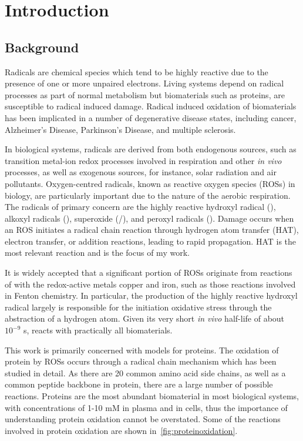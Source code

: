 
 \chapter{Introduction}

\section{Background}
Radicals are chemical species which tend to be highly reactive due to the presence of one or more unpaired electrons. Living systems depend on radical processes as part of normal metabolism but biomaterials such as proteins, are susceptible to radical induced damage. Radical induced oxidation of biomaterials has been implicated in a number of degenerative disease states, including cancer, Alzheimer's Disease, Parkinson's Disease, and multiple sclerosis.\cite{Barnham2004,Halliwell2007,Valko2007,Hwang2013,Halliwell2015}

In biological systems, radicals are derived from both endogenous sources, such as transition metal-ion redox processes involved in respiration and other \emph{in vivo} processes, as well as exogenous sources, for instance, solar radiation and air pollutants. Oxygen-centred radicals, known as reactive oxygen species (ROSs) in biology, are particularly important due to the nature of the aerobic respiration. The radicals of primary concern are the highly reactive hydroxyl radical (), alkoxyl radicals (), superoxide (/), and peroxyl radicals ().\cite{Halliwell2015} Damage occurs when an ROS initiates a radical chain reaction through hydrogen atom transfer (HAT), electron transfer, or addition reactions, leading to rapid propagation. HAT is the most relevant reaction and is the focus of my work.

It is widely accepted that a significant portion of ROSs originate from reactions of  with the redox-active metals copper and iron,\cite{Halliwell2015} such as those reactions involved in Fenton chemistry.\cite{Stohs1995} In particular, the production of the highly reactive hydroxyl radical largely is responsible for the initiation oxidative stress through the abstraction of a hydrogen atom. Given its very short \emph{in vivo} half-life of about $10^{-9}$ s,  reacts with practically all biomaterials.\cite{Sies1993}

This work is primarily concerned with models for proteins. The oxidation of protein by ROSs occurs through a radical chain mechanism which has been studied in detail.\cite{Berlett1997,Davies2016} As there are 20 common amino acid side chains, as well as a common peptide backbone in protein, there are a large number of possible reactions. Proteins are the most abundant biomaterial in most biological systems, with concentrations of 1-10 mM in plasma and in cells\cite{Davies2005}, thus the importance of understanding protein oxidation cannot be overstated. Some of the reactions involved in protein oxidation are shown in~\ref{fig:proteinoxidation}.

